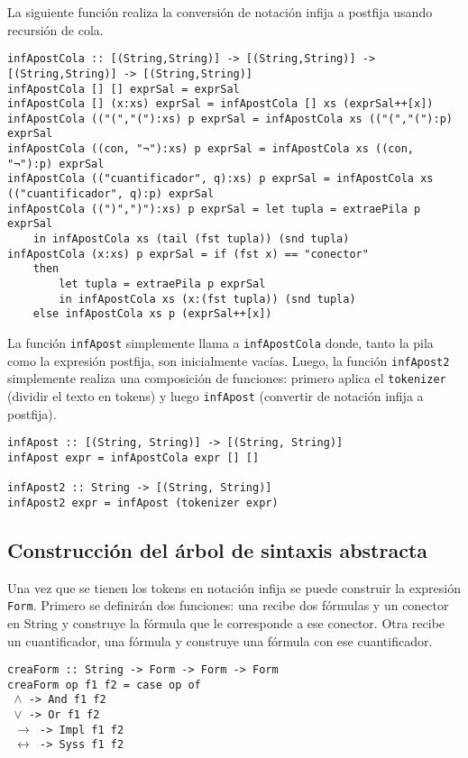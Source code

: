 \documentclass{article}
\begin{document}
La siguiente función realiza la conversión de notación infija a postfija usando recursión de cola.

{\small
\begin{verbatim}
infApostCola :: [(String,String)] -> [(String,String)] -> [(String,String)] -> [(String,String)]
infApostCola [] [] exprSal = exprSal
infApostCola [] (x:xs) exprSal = infApostCola [] xs (exprSal++[x])
infApostCola (("(","("):xs) p exprSal = infApostCola xs (("(","("):p) exprSal
infApostCola ((con, "¬"):xs) p exprSal = infApostCola xs ((con, "¬"):p) exprSal
infApostCola (("cuantificador", q):xs) p exprSal = infApostCola xs (("cuantificador", q):p) exprSal
infApostCola ((")",")"):xs) p exprSal = let tupla = extraePila p exprSal
    in infApostCola xs (tail (fst tupla)) (snd tupla)
infApostCola (x:xs) p exprSal = if (fst x) == "conector"
    then
        let tupla = extraePila p exprSal
        in infApostCola xs (x:(fst tupla)) (snd tupla)
    else infApostCola xs p (exprSal++[x])
\end{verbatim}
}

La función \texttt{infApost} simplemente llama a \texttt{infApostCola} donde, tanto la pila como la expresión postfija, son inicialmente vacías. Luego, la función \texttt{infApost2} simplemente realiza una composición de funciones: primero aplica el \texttt{tokenizer} (dividir el texto en tokens) y luego \texttt{infApost} (convertir de notación infija a postfija).

\begin{verbatim}
infApost :: [(String, String)] -> [(String, String)]
infApost expr = infApostCola expr [] []

infApost2 :: String -> [(String, String)]
infApost2 expr = infApost (tokenizer expr)
\end{verbatim}

\subsection{Construcción del árbol de sintaxis abstracta}

Una vez que se tienen los tokens en notación infija se puede construir la expresión \texttt{Form}. Primero se definirán dos funciones: una recibe dos fórmulas y un conector en String y construye la fórmula que le corresponde a ese conector. Otra recibe un cuantificador, una fórmula y construye una fórmula con ese cuantificador.

\texttt{creaForm :: String -> Form -> Form -> Form}\\
\texttt{creaForm op f1 f2 = case op of}\\
\texttt{    $\land$ -> And f1 f2}\\
\texttt{    $\lor$ -> Or f1 f2}\\
\texttt{    $\rightarrow$ -> Impl f1 f2}\\
\texttt{    $\leftrightarrow$ -> Syss f1 f2}\\
\end{document}
